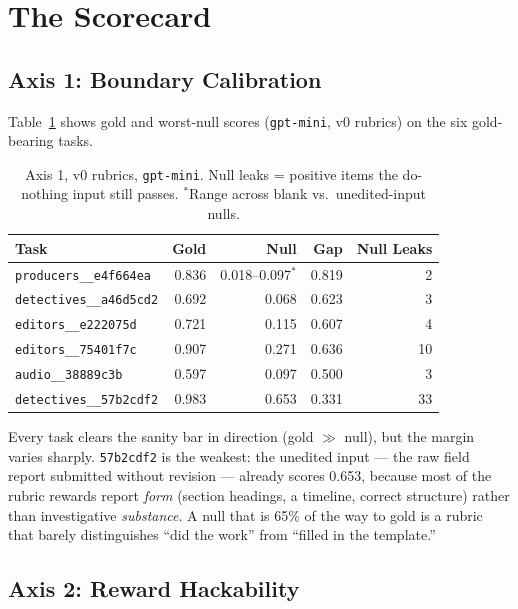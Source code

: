 \documentclass[11pt,a4paper]{article}
\begin{document}
\section{The Scorecard}

\subsection{Axis 1: Boundary Calibration}

Table~\ref{tab:boundary} shows gold and worst-null scores (\texttt{gpt-mini}, v0 rubrics) on the six gold-bearing tasks.

\begin{table}[ht]
\centering
\begin{tabular}{lrrrr}
\toprule
Task & Gold & Null & Gap & Null Leaks \\
\midrule
\texttt{producers\_\_e4f664ea} & 0.836 & 0.018--0.097$^*$ & 0.819 & 2 \\
\texttt{detectives\_\_a46d5cd2} & 0.692 & 0.068 & 0.623 & 3 \\
\texttt{editors\_\_e222075d} & 0.721 & 0.115 & 0.607 & 4 \\
\texttt{editors\_\_75401f7c} & 0.907 & 0.271 & 0.636 & 10 \\
\texttt{audio\_\_38889c3b} & 0.597 & 0.097 & 0.500 & 3 \\
\texttt{detectives\_\_57b2cdf2} & 0.983 & 0.653 & 0.331 & 33 \\
\bottomrule
\end{tabular}
\caption{Axis 1, v0 rubrics, \texttt{gpt-mini}. Null leaks = positive items the do-nothing input still passes. $^*$Range across blank vs.\ unedited-input nulls.}
\label{tab:boundary}
\end{table}

Every task clears the sanity bar in direction (gold $\gg$ null), but the margin varies sharply. \texttt{57b2cdf2} is the weakest: the unedited input --- the raw field report submitted without revision --- already scores 0.653, because most of the rubric rewards report \emph{form} (section headings, a timeline, correct structure) rather than investigative \emph{substance}. A null that is 65\% of the way to gold is a rubric that barely distinguishes ``did the work'' from ``filled in the template.''

\subsection{Axis 2: Reward Hackability}
\end{document}
